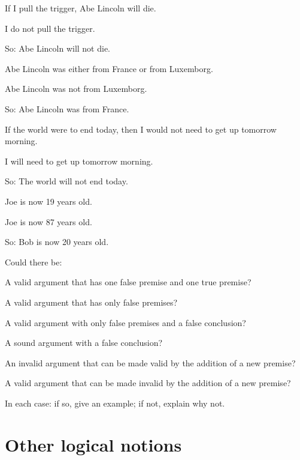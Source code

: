 \begin{earg}
\item If I pull the trigger, Abe Lincoln will die.
\item I do not pull the trigger.
\item[So:] Abe Lincoln will not die.
\end{earg}

\begin{earg}
\item Abe Lincoln was either from France or from Luxemborg.
\item Abe Lincoln was not from Luxemborg.
\item[So:] Abe Lincoln was from France.
\end{earg}

\begin{earg}
\item If the world were to end today, then I would not need to get up tomorrow morning.
\item I will need to get up tomorrow morning.
\item[So:] The world will not end today.
\end{earg}

\begin{earg}
\item Joe is now 19 years old.
\item Joe is now 87 years old.
\item[So:] Bob is now 20 years old.
\end{earg}

\problempart
Could there be:
	\begin{earg}
		\item A valid argument that has one false premise and one true premise?
		\item A valid argument that has only false premises?
		\item A valid argument with only false premises and a false conclusion?
		\item A sound argument with a false conclusion?
		\item An invalid argument that can be made valid by the addition of a new premise?
		\item A valid argument that can be made invalid by the addition of a new premise?
	\end{earg}
In each case: if so, give an example; if not, explain why not.


\chapter{Other logical notions}\label{s:BasicNotions}

